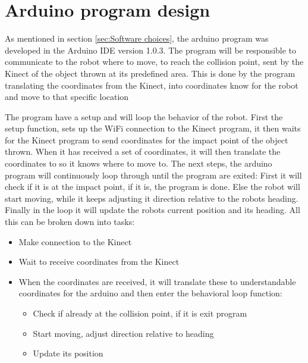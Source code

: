 \section{Arduino program design}
\label{sec:Arduino program design}
As mentioned in section \ref{sec:Software choices}, the arduino program was developed in the Arduino IDE version 1.0.3. The program will be responsible to communicate to the robot where to move, to reach the collision point, sent by the Kinect of the object thrown at its predefined area. This is done by the program translating the coordinates from the Kinect, into coordinates know for the robot and move to that specific location

The program have a setup and will loop the behavior of the robot. First the setup function, sets up the WiFi connection to the Kinect program, it then waits for the Kinect program to send coordinates for the impact point of the object thrown. When it has received a set of coordinates, it will then translate the coordinates to so it knows where to move to. The next steps, the arduino program will continuously loop through until the program are exited: First it will check if it is at the impact point, if it is, the program is done. Else the robot will start moving, while it keeps adjusting it direction relative to the robots heading. Finally in the loop it will update the robots current position and its heading. All this can be broken down into tasks:

\begin{itemize}
	\item Make connection to the Kinect
	\item Wait to receive coordinates from the Kinect
	\item When the coordinates are received, it will translate these to understandable coordinates for the arduino and then enter the behavioral loop function:
	\begin{itemize}
		\item Check if already at the collision point, if it is exit program
		\item Start moving, adjust direction relative to heading
		\item Update its position
	\end{itemize}
\end{itemize}
 
